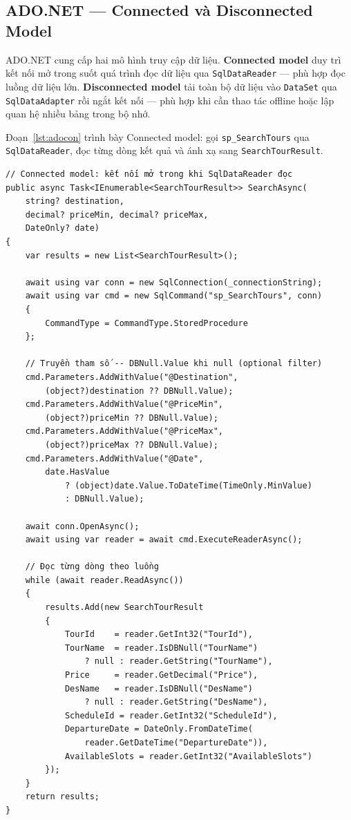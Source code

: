 \subsection{ADO.NET — Connected và Disconnected Model}
  \label{sub3.4.4}

\begin{de}\label{def3.8}
ADO.NET cung cấp hai mô hình truy cập dữ liệu. \textbf{Connected
model} duy trì kết nối mở trong suốt quá trình đọc dữ liệu qua
\texttt{SqlDataReader} — phù hợp đọc luồng dữ liệu lớn.
\textbf{Disconnected model} tải toàn bộ dữ liệu vào
\texttt{DataSet} qua \texttt{SqlDataAdapter} rồi ngắt kết nối
— phù hợp khi cần thao tác offline hoặc lập quan hệ nhiều bảng
trong bộ nhớ.
\end{de}

Đoạn~\ref{lst:adocon} trình bày Connected model: gọi
\texttt{sp\_SearchTours} qua \texttt{SqlDataReader}, đọc từng
dòng kết quả và ánh xạ sang \texttt{SearchTourResult}.

\begin{lstlisting}[style=csharp,
  caption={ADO.NET Connected Model -- gọi sp\_SearchTours},
  label={lst:adocon}]
// Connected model: kết nối mở trong khi SqlDataReader đọc
public async Task<IEnumerable<SearchTourResult>> SearchAsync(
    string? destination,
    decimal? priceMin, decimal? priceMax,
    DateOnly? date)
{
    var results = new List<SearchTourResult>();

    await using var conn = new SqlConnection(_connectionString);
    await using var cmd = new SqlCommand("sp_SearchTours", conn)
    {
        CommandType = CommandType.StoredProcedure
    };

    // Truyền tham số -- DBNull.Value khi null (optional filter)
    cmd.Parameters.AddWithValue("@Destination",
        (object?)destination ?? DBNull.Value);
    cmd.Parameters.AddWithValue("@PriceMin",
        (object?)priceMin ?? DBNull.Value);
    cmd.Parameters.AddWithValue("@PriceMax",
        (object?)priceMax ?? DBNull.Value);
    cmd.Parameters.AddWithValue("@Date",
        date.HasValue
            ? (object)date.Value.ToDateTime(TimeOnly.MinValue)
            : DBNull.Value);

    await conn.OpenAsync();
    await using var reader = await cmd.ExecuteReaderAsync();

    // Đọc từng dòng theo luồng
    while (await reader.ReadAsync())
    {
        results.Add(new SearchTourResult
        {
            TourId    = reader.GetInt32("TourId"),
            TourName  = reader.IsDBNull("TourName")
                ? null : reader.GetString("TourName"),
            Price     = reader.GetDecimal("Price"),
            DesName   = reader.IsDBNull("DesName")
                ? null : reader.GetString("DesName"),
            ScheduleId = reader.GetInt32("ScheduleId"),
            DepartureDate = DateOnly.FromDateTime(
                reader.GetDateTime("DepartureDate")),
            AvailableSlots = reader.GetInt32("AvailableSlots")
        });
    }
    return results;
}
\end{lstlisting}

